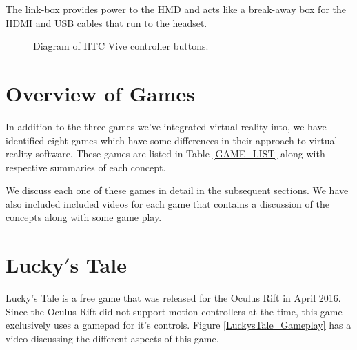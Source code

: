 \documentclass[journal]{IEEEtran}
\begin{document}
The link-box provides power to the HMD and acts like a break-away box for the HDMI and USB cables that run to the headset. 



\begin{figure}[H]
	
	\noindent
	\caption{Diagram of HTC Vive controller buttons.\cite{htc_vive_controller_buttons}}\label{ViveControllerButtons}
\end{figure}


\section{Overview of Games}
In addition to the three games we've integrated virtual reality into, we have identified eight games which have some differences in their approach to virtual reality software. These games are listed in Table \ref{GAME_LIST} along with respective summaries of each concept. 



We discuss each one of these games in detail in the subsequent sections. We have also included included videos for each game that contains a discussion of the concepts along with some game play.  


 

\section{Lucky$'$s Tale}

Lucky's Tale is a free game that was released for the Oculus Rift in April 2016. Since the Oculus Rift did not support motion controllers at the time, this game exclusively uses a gamepad for it's controls. Figure \ref{LuckysTale_Gameplay} has a video discussing the different aspects of this game. 

\begin{figure}[h]
	\noindent
\end{figure}
\end{document}
